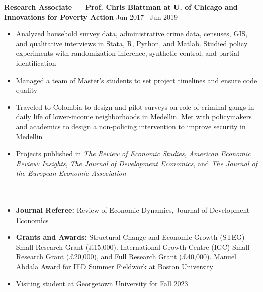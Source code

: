 \documentclass[10pt]{article}
\newenvironment{customitemize}
{ \begin{itemize}[leftmargin=\parindent, topsep = 0.2pt, itemsep = -3pt] }
{\end{itemize} }
\begin{document}

\noindent \textbf{Research Associate --- Prof. Chris Blattman at U. of Chicago and Innovations for Poverty Action}  \hfill Jun 2017-- Jun 2019 
\begin{customitemize}
	\item Analyzed household survey data, administrative crime data, censuses, GIS, and qualitative interviews in Stata, R, Python, and Matlab. Studied policy experiments with randomization inference, synthetic control, and partial identification
	\item Managed a team of Master's students to set project timelines and ensure code quality 
	\item Traveled to Colombia to design and pilot surveys on role of criminal gangs in daily life of lower-income neighborhoods in Medellin. Met with policymakers and academics to design a non-policing intervention to improve security in Medellin
	\item Projects published in \textit{The Review of Economic Studies}, \textit{American Economic Review: Insights}, \textit{The Journal of Development Economics}, and \textit{The Journal of the European Economic Association}
\end{customitemize}

\section*{} 
\noindent \rule{\textwidth}{1pt} 
\begin{customitemize}
	\item \textbf{Journal Referee:} Review of Economic Dynamics, Journal of Development Economics
	\item \textbf{Grants and Awards:} Structural Change and Economic Growth (STEG) Small Research Grant (\pounds15,000). International Growth Centre (IGC) Small Research Grant (\pounds20,000), and Full Research Grant (\pounds40,000). Manuel Abdala Award for IED Summer Fieldwork at Boston University
	\item Visiting student at Georgetown University for Fall 2023
\end{customitemize}
\end{document}
